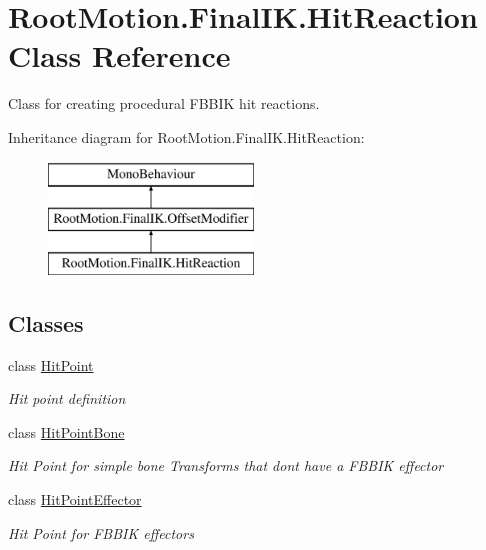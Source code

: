 \hypertarget{class_root_motion_1_1_final_i_k_1_1_hit_reaction}{}\section{Root\+Motion.\+Final\+I\+K.\+Hit\+Reaction Class Reference}
\label{class_root_motion_1_1_final_i_k_1_1_hit_reaction}


Class for creating procedural F\+B\+B\+IK hit reactions.  


Inheritance diagram for Root\+Motion.\+Final\+I\+K.\+Hit\+Reaction\+:\begin{figure}[H]
\begin{center}
\leavevmode
\includegraphics[height=3.000000cm]{class_root_motion_1_1_final_i_k_1_1_hit_reaction}
\end{center}
\end{figure}
\subsection*{Classes}
\begin{DoxyCompactItemize}
\item 
class \mbox{\hyperlink{class_root_motion_1_1_final_i_k_1_1_hit_reaction_1_1_hit_point}{Hit\+Point}}
\begin{DoxyCompactList}\small\item\em Hit point definition \end{DoxyCompactList}\item 
class \mbox{\hyperlink{class_root_motion_1_1_final_i_k_1_1_hit_reaction_1_1_hit_point_bone}{Hit\+Point\+Bone}}
\begin{DoxyCompactList}\small\item\em Hit Point for simple bone Transforms that don\textquotesingle{}t have a F\+B\+B\+IK effector \end{DoxyCompactList}\item 
class \mbox{\hyperlink{class_root_motion_1_1_final_i_k_1_1_hit_reaction_1_1_hit_point_effector}{Hit\+Point\+Effector}}
\begin{DoxyCompactList}\small\item\em Hit Point for F\+B\+B\+IK effectors \end{DoxyCompactList}\end{DoxyCompactItemize}
